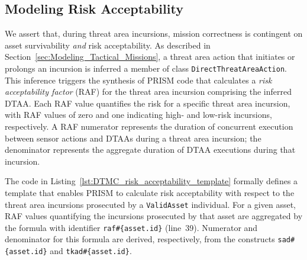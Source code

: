 \subsection{Modeling Risk Acceptability}
\label{sec:Modeling_Risk_Acceptability}

We assert that, during threat area incursions, mission correctness is contingent on asset survivability \emph{and} risk acceptability. As described in Section~\ref{sec:Modeling_Tactical_Missions}, a threat area action that initiates or prolongs an incursion is inferred a member of class \texttt{DirectThreat\-AreaAction}. This inference triggers the synthesis of PRISM code that calculates a \emph{risk acceptability factor} (RAF) for the threat area incursion comprising the inferred DTAA\@. Each RAF value quantifies the risk for a specific threat area incursion, with RAF values of zero and one indicating high- and low-risk incursions, respectively. A RAF numerator represents the duration of concurrent execution between sensor actions and DTAAs during a threat area incursion; the denominator represents the aggregate duration of DTAA executions during that incursion.

The code in Listing~\ref{lst:DTMC_risk_acceptability_template} formally defines a template that enables PRISM to calculate risk acceptability with respect to the threat area incursions prosecuted by a \texttt{ValidAsset} individual. For a given asset, RAF values quantifying the incursions prosecuted by that asset are aggregated by the formula with identifier \texttt{raf\#\{asset.id\}} (line~39). Numerator and denominator for this formula are derived, respectively, from the constructs \texttt{sad\#\{asset.id\}} and \texttt{tkad\#\{asset.id\}}.

